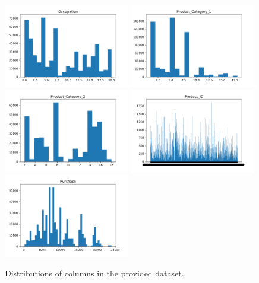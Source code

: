 \documentclass{article}
\begin{document}
\begin{figure}[h]
\begin{center}
    \includegraphics[width=0.49\textwidth]{plots/explore_Occupation.pdf}
    \includegraphics[width=0.49\textwidth]{plots/explore_Product_Category_1.pdf}
    \includegraphics[width=0.49\textwidth]{plots/explore_Product_Category_2.pdf}
    \includegraphics[width=0.49\textwidth]{plots/explore_Product_ID.pdf}
    \includegraphics[width=0.49\textwidth]{plots/explore_Purchase.pdf}

  \end{center}
  \caption{Distributions of columns in the provided dataset.}
  \label{fig:exploration}
\end{figure}
\end{document}
